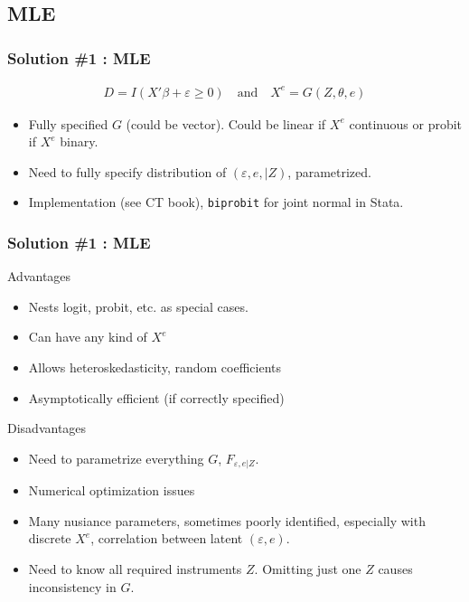 \subsection{MLE}

\begin{frame}
\frametitle{Solution \#1 : MLE}
\begin{eqnarray*}
D = I ( X' \beta + \varepsilon \geq 0 ) \quad \mbox{and} \quad X^e = G(Z,\theta,e)
\end{eqnarray*}
\begin{itemize}
\item Fully specified $G$ (could be vector). Could be linear if $X^e$ continuous or probit if $X^e$ binary.
\item Need to fully specify distribution of $(\varepsilon,e, | Z)$, parametrized.
\item Implementation (see CT book), \texttt{biprobit} for joint normal in Stata.
\end{itemize}
\end{frame}


\begin{frame}
\frametitle{Solution \#1 : MLE}
\vspace{-10pt}
\begin{block}{Advantages}
\begin{itemize}
\item Nests logit, probit, etc. as special cases.
\item Can have any kind of $X^e$
\item Allows heteroskedasticity, random coefficients
\item Asymptotically efficient (if correctly specified)
\end{itemize}
\end{block}

\begin{block}{Disadvantages}
\begin{itemize}
\item Need to parametrize everything $G$, $F_{\varepsilon,e|Z}$.
\item Numerical optimization issues
\item Many nusiance parameters, sometimes poorly identified, especially with discrete $X^e$, correlation between latent $(\varepsilon,e)$.
\item Need to know all required instruments $Z$. Omitting just one $Z$ causes inconsistency in $G$. %
\end{itemize}
\end{block}
\end{frame}

